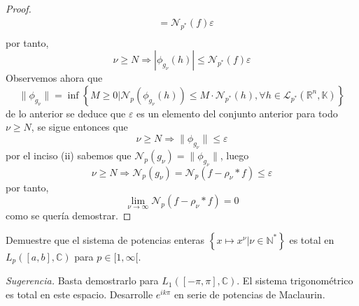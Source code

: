 \documentclass[12pt]{report}
\theoremstyle{largebreak}
\newcommand\abs[1]{\ensuremath{\left|#1\right|}}
\newcommand{\N}[2]{\ensuremath{\mathcal{N}_{#1}\left(#2\right)}}
\newcommand{\norm}[1]{\ensuremath{\|#1\|}}
\begin{document}
\begin{proof}
\begin{equation*}
\begin{split}
                &=\N{p^*}{f}\varepsilon\\
            \end{split}
        \end{equation*}
        por tanto,
        \begin{equation*}
            \nu\geq N\Rightarrow\abs{\phi_{ g_\nu}(h)}\leq\N{p^*}{f}\varepsilon
        \end{equation*}
        Observemos ahora que
        \begin{equation*}
            \norm{\phi_{ g_\nu}}=\inf\left\{M\geq0\Big|\N{p}{\phi_{ g_\nu}(h)}\leq M\cdot\N{p^*}{h},\forall h\in\mathcal{L}_{ p^*}(\mathbb{R}^n,\mathbb{K}) \right\}
        \end{equation*}
        de lo anterior se deduce que $\varepsilon$ es un elemento del conjunto anterior para todo $\nu\geq N$, se sigue entonces que
        \begin{equation*}
            \nu\geq N\Rightarrow\norm{\phi_{g_\nu}}\leq\varepsilon
        \end{equation*}
        por el inciso (ii) sabemos que $\N{p}{g_\nu}=\norm{\phi_{g_\nu}}$, luego
        \begin{equation*}
            \nu\geq N\Rightarrow\N{p}{g_\nu}=\N{p}{f-\rho_\nu*f}\leq\varepsilon
        \end{equation*}
        por tanto,
        \begin{equation*}
            \lim_{ \nu\rightarrow\infty}\N{p}{f-\rho_\nu*f}=0
        \end{equation*}
        como se quería demostrar.
    \end{proof}

    \begin{excer}
        Demuestre que el sistema de potencias enteras $\left\{x\mapsto x^\nu\Big|\nu\in\mathbb{N}^* \right\}$ es total en $L_p([a,b],\mathbb{C})$ para $p\in[1,\infty[$.

        \textit{Sugerencia.} Basta demostrarlo para $L_1([-\pi,\pi],\mathbb{C})$. El sistema trigonométrico es total en este espacio. Desarrolle $e^{ik\pi}$ en serie de potencias de Maclaurin.
    \end{excer}
\end{document}
